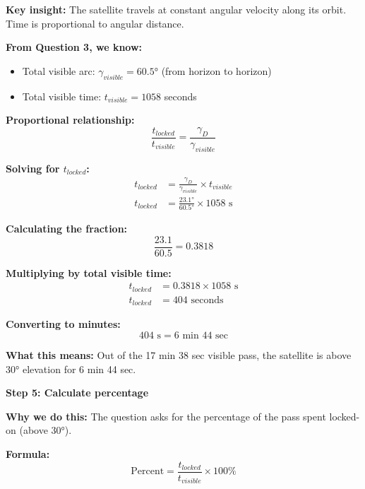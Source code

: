 \documentclass[11pt,letterpaper]{article}
\begin{document}
\textbf{Key insight:} The satellite travels at constant angular velocity along its orbit. Time is proportional to angular distance.

\textbf{From Question 3, we know:}
\begin{itemize}
    \item Total visible arc: $\gamma_{visible} = 60.5°$ (from horizon to horizon)
    \item Total visible time: $t_{visible} = 1058$ seconds
\end{itemize}

\textbf{Proportional relationship:}
\begin{equation}
\frac{t_{locked}}{t_{visible}} = \frac{\gamma_D}{\gamma_{visible}}
\end{equation}

\textbf{Solving for $t_{locked}$:}
\begin{align}
t_{locked} &= \frac{\gamma_D}{\gamma_{visible}} \times t_{visible} \\
t_{locked} &= \frac{23.1°}{60.5°} \times 1058 \text{ s}
\end{align}

\textbf{Calculating the fraction:}
\begin{equation}
\frac{23.1}{60.5} = 0.3818
\end{equation}

\textbf{Multiplying by total visible time:}
\begin{align}
t_{locked} &= 0.3818 \times 1058 \text{ s} \\
t_{locked} &= 404 \text{ seconds}
\end{align}

\textbf{Converting to minutes:}
\begin{equation}
404 \text{ s} = 6 \text{ min } 44 \text{ sec}
\end{equation}

\textbf{What this means:} Out of the 17 min 38 sec visible pass, the satellite is above 30° elevation for 6 min 44 sec.

\vspace{0.3cm}

\textbf{Step 5: Calculate percentage}

\textbf{Why we do this:} The question asks for the percentage of the pass spent locked-on (above 30°).

\textbf{Formula:}
\begin{equation}
\text{Percent} = \frac{t_{locked}}{t_{visible}} \times 100\%
\end{equation}
\end{document}
